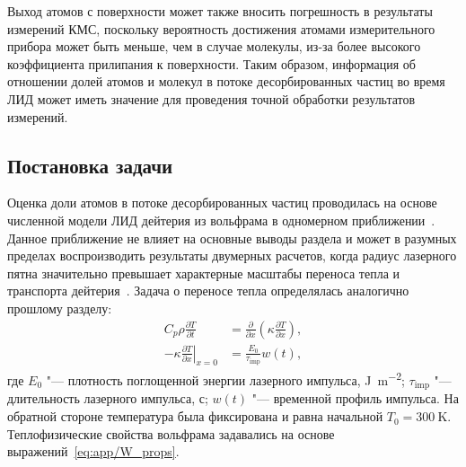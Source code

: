 Выход атомов с поверхности может также вносить погрешность в результаты измерений КМС, поскольку вероятность достижения атомами измерительного прибора может быть меньше, чем в случае молекулы, из-за более высокого коэффициента прилипания к поверхности. Таким образом, информация об отношении долей атомов и молекул в потоке десорбированных частиц во время ЛИД может иметь значение для проведения точной обработки результатов измерений.

\subsection{Постановка задачи}\label{subsec:ch4/sec2/subsec1}
Оценка доли атомов в потоке десорбированных частиц проводилась на основе численной модели ЛИД дейтерия из вольфрама в одномерном приближении~\cite{Kulagin2023}. Данное приближение не влияет на основные выводы раздела и может в разумных пределах воспроизводить результаты двумерных расчетов, когда радиус лазерного пятна значительно превышает характерные масштабы переноса тепла и транспорта дейтерия~\cite{Stepanenko2024}. Задача о переносе тепла определялась аналогично прошлому разделу:
\begin{subequations}
    \label{eq:ch4/LID_heat_equation}
    \begin{align}
        C_p \rho \frac{\partial T}{\partial t}                         & = \frac{\partial}{\partial x}\left( \kappa \frac{\partial T}{\partial x} \right), \\
        -\kappa \left. \frac{\partial T}{\partial x} \right\vert_{x=0} & = \frac{E_0}{\tau_\mathrm{imp}} w(t),
    \end{align}
\end{subequations}
где \( E_0 \) "--- плотность поглощенной энергии лазерного импульса, \si{\joule\per\meter\squared}; \( \tau_\mathrm{imp} \) "--- длительность лазерного импульса, с; \(w(t) \) "--- временной профиль импульса. На обратной стороне температура была фиксирована и равна начальной \(T_0=\SI{300}{\kelvin}\). Теплофизические свойства вольфрама задавались на основе выражений~\cref{eq:app/W_props}.

